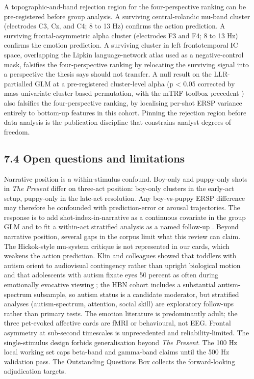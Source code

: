 \documentclass[preprint,12pt]{elsarticle}
\begin{document}
A topographic-and-band rejection region for the four-perspective ranking can be pre-registered before group analysis. A surviving central-rolandic mu-band cluster (electrodes C3, Cz, and C4; 8 to 13 Hz) confirms the action prediction. A surviving frontal-asymmetric alpha cluster (electrodes F3 and F4; 8 to 13 Hz) confirms the emotion prediction. A surviving cluster in left frontotemporal IC space, overlapping the Lipkin language-network atlas \cite{Lipkin2022ProbabilisticAF} used as a negative-control mask, falsifies the four-perspective ranking by relocating the surviving signal into a perspective the thesis says should not transfer. A null result on the LLR-partialled GLM at a pre-registered cluster-level alpha (p < 0.05 corrected by mass-univariate cluster-based permutation, with the mTRF toolbox precedent \cite{Crosse2016TheMT}) also falsifies the four-perspective ranking, by localising per-shot ERSP variance entirely to bottom-up features in this cohort. Pinning the rejection region before data analysis is the publication discipline that constrains analyst degrees of freedom.

\subsection{7.4 Open questions and limitations}

Narrative position is a within-stimulus confound. Boy-only and puppy-only shots in \textit{The Present} differ on three-act position: boy-only clusters in the early-act setup, puppy-only in the late-act resolution. Any boy-vs-puppy ERSP difference may therefore be confounded with prediction-error or arousal trajectories. The response is to add shot-index-in-narrative as a continuous covariate in the group GLM and to fit a within-act stratified analysis as a named follow-up \cite{Magliano2011TheIO,baldassano2017event,chen2017shared}. Beyond narrative position, several gaps in the corpus limit what this review can claim. The Hickok-style mu-system critique is not represented in our cards, which weakens the action prediction. Klin and colleagues showed that toddlers with autism orient to audiovisual contingency rather than upright biological motion \cite{klin2009biological} and that adolescents with autism fixate eyes 50 percent as often during emotionally evocative viewing \cite{klin2002visual}; the HBN cohort includes a substantial autism-spectrum subsample, so autism status is a candidate moderator, but stratified analyses (autism-spectrum, attention, social skill) are exploratory follow-ups rather than primary tests. The emotion literature is predominantly adult; the three pet-evoked affective cards are fMRI or behavioural, not EEG. Frontal asymmetry at sub-second timescales is unprecedented and reliability-limited. The single-stimulus design forbids generalisation beyond \textit{The Present}. The 100 Hz local working set caps beta-band and gamma-band claims until the 500 Hz validation pass. The Outstanding Questions Box collects the forward-looking adjudication targets.
\end{document}
